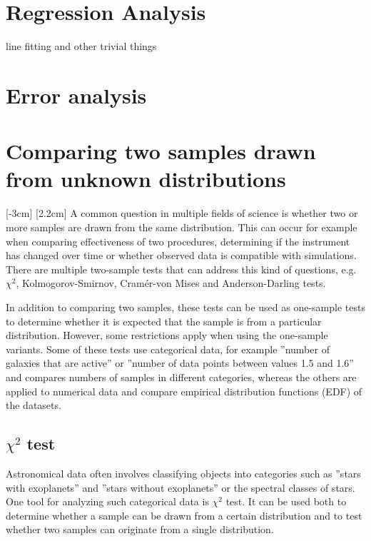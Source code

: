 \documentclass[english, oneside]{HYgradu}
\begin{document}
\section{Regression Analysis}
line fitting and other trivial things

\section{Error analysis}



\section{Comparing two samples drawn from unknown distributions}
\reversemarginpar
{}[-3cm]
[2.2cm]
A common question in multiple fields of science is whether two or more samples are drawn from the same distribution. This can occur for example when comparing effectiveness of two procedures, determining if the instrument has changed over time or whether observed data is compatible with simulations. There are multiple two-sample tests that can address this kind of questions, e.g. $\chi^2$, Kolmogorov-Smirnov, Cram\'er-von Mises and Anderson-Darling tests. \citep{bohm2010introduction, feigelson2012modern}

In addition to comparing two samples, these tests can be used as one-sample tests to determine whether it is expected that the sample is from a particular distribution. However, some restrictions apply when using the one-sample variants. Some of these tests use categorical data, for example ''number of galaxies that are active'' or ''number of data points between values 1.5 and 1.6'' and compares numbers of samples in different categories, whereas the others are applied to numerical data and compare empirical distribution functions (EDF) of the datasets. \citep{feigelson2012modern}


\subsection{$\chi^2$ test}
\reversemarginpar
{}
Astronomical data often involves classifying objects into categories such as ''stars with exoplanets'' and ''stars without exoplanets'' or the spectral classes of stars. One tool for analyzing such categorical data is $\chi^2$ test. It can be used both to determine whether a sample can be drawn from a certain distribution and to test whether two samples can originate from a single distribution. \citep{feigelson2012modern, corder2014nonparametric}
\end{document}
